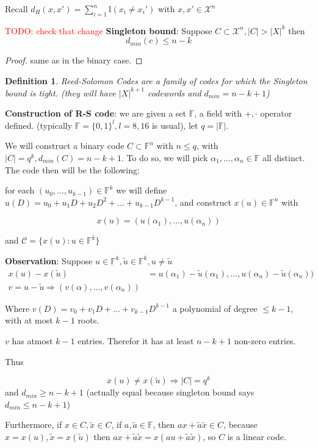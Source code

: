 \documentclass[twoside]{article}
\newtheorem{definition}{Definition}[section]
\theoremstyle{definition} %
\newcommand{\todo}[1]{\textcolor{red}{TODO: #1}}
\def\X{\mathcal{X}}
\def\F{\mathbb{F}}
\def\I{\mathbb{I}}
\def\C{\mathcal{C}}
\begin{document}
Recall $d_H(x, x') = \sum_{i = 1}^n \I(x_i \neq x_i')$ with $x, x'\in \X^n$

\todo{check that change}
\textbf{Singleton bound}: Suppose $C \subset \X^n, |C| > |X|^k$ then
\[
  d_{min}(c) \leq n - k
\]

\begin{proof}
  same as in the binary case.
\end{proof}

\begin{definition}{Reed-Solomon Codes}
  are a family of codes for which the Singleton bound is tight. (they will have $|X|^{k+1}$ codewords and $d_{min} = n - k + 1$)
\end{definition}

\textbf{Construction of R-S code}: we are given a set $\F$, a field with $+, \cdot$ operator defined. (typically $\F = \{ 0, 1 \}^l, l = 8, 16$ is usual), let $q = |\F|$.

We will construct a binary code $C \subset \F^n$ with $n \leq q$, with $|C| = q^k, d_{min}(C) = n - k + 1$. To do so, we will pick $\alpha_1, ... , \alpha_n \in \F$ all distinct. The code then will be the following:

for each $(u_0, ..., u_{k-1}) \in \F^k$ we will define $u(D) = u_0 + u_1 D + u_2 D^2 + ... + u_{k-1} D^{k-1}$, and construct $x(u) \in \F^n$ with

\[
  x(u) = (u(\alpha_1), ..., u(\alpha_n))
\]

and $ \C = \{ x(u): u \in \F^k \}$

\textbf{Observation}: Suppose $u \in \F^k, \tilde{u} \in \F^k, u \neq \tilde{u}$
\begin{align*}
  x(u) - x(\tilde{u}) &= u(\alpha_1) - \tilde{u}(\alpha_1), ..., u(\alpha_n) - \tilde{u}(\alpha_n)) \\
  v = u - \tilde{u} \Rightarrow (v(\alpha), ..., v(\alpha_n))
\end{align*}

Where $v(D) = v_0 + v_1 D + ... + v_{k-1} D^{k-1}$ a polynomial of degree $\leq k-1$, with at most $k-1$ roots.

$v$ has atmost $k-1$ entries. Therefor it has at least $n - k + 1$ non-zero entries.

Thus

\[
  x(u) \neq x(\tilde u) \Rightarrow |C| = q^k
\]
and $d_{min} \geq n - k + 1$ (actually equal because singleton bound says $d_{min} \leq n - k + 1$)

Furthermore, if $x \in C, \tilde{x} \in C$, if $a, \tilde{a} \in \F$, then $ax + \tilde{a} \tilde{x} \in C$, because $x = x(u), \tilde{x} = x(\tilde{u})$ then $ax + \tilde{a} \tilde{x} = x(a u +  \tilde{a} \tilde{x})$, so $C$ is a linear code.
\end{document}
